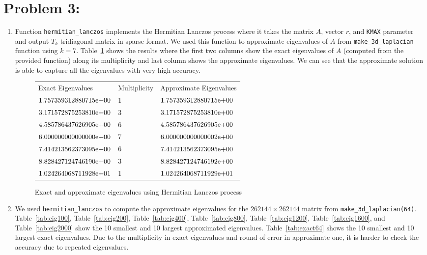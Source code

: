 \newpage
\section*{Problem 3:}
\begin{enumerate}
\item Function \texttt{hermitian\_lanczos} implements the Hermitian Lanczos process where it takes the matrix $A$, vector $r$, and \texttt{KMAX} parameter and output $T_{k}$ tridiagonal matrix in sparse format. We used this function to approximate eigenvalues of $A$ from \texttt{make\_3d\_laplacian} function using $k=7$. Table~\ref{tab:eig7} shows the results where the first two columns show the exact eigenvalues of $A$ (computed from the provided function) along its multiplicity and last column shows the approximate eigenvalues. We can see that the approximate solution is able to capture all the eigenvalues with very high accuracy.

\begin{figure}[tbh]
 \centering    
\begin{tabular}{ |p{5cm}| p{2cm}|| p{5cm}|}
\hline
 Exact Eigenvalues  & Multiplicity & Approximate Eigenvalues \\ \hhline{|=|=|=|}   
${1.757359312880715}\mathrm{e}{+00}$ & 1& ${1.757359312880715}\mathrm{e}{+00}$ \\
${3.171572875253810}\mathrm{e}{+00}$ &3 & ${3.171572875253810}\mathrm{e}{+00}$ \\
${4.585786437626905}\mathrm{e}{+00}$ &6 & ${4.585786437626905}\mathrm{e}{+00}$ \\
${6.000000000000000}\mathrm{e}{+00}$ & 7& ${6.000000000000002}\mathrm{e}{+00}$ \\
${7.414213562373095}\mathrm{e}{+00}$&6 & ${7.414213562373095}\mathrm{e}{+00}$ \\
${8.828427124746190}\mathrm{e}{+00}$ &3 & ${8.828427124746192}\mathrm{e}{+00}$ \\
${1.024264068711928}\mathrm{e}{+01}$ &1 & ${1.024264068711929}\mathrm{e}{+01}$ \\
\hline
\end{tabular} 
\caption{Exact and approximate eigenvalues using Hermitian Lanczos process}
   \label{tab:eig7}
\end{figure}

\item We used \texttt{hermitian\_lanczos} to compute the approximate eigenvalues for the $262144 \times 262144$ matrix from \texttt{make\_3d\_laplacian(64)}. Table~\ref{tab:eig100}, Table~\ref{tab:eig200}, Table~\ref{tab:eig400}, Table~\ref{tab:eig800}, Table~\ref{tab:eig1200}, Table~\ref{tab:eig1600}, and Table~\ref{tab:eig2000} show the 10 smallest and 10 largest approximated eigenvalues. Table~\ref{tab:exact64} shows the 10 smallest and 10 largest exact eigenvalues. Due to the multiplicity in exact eigenvalues and round of error in approximate one, it is harder to check the accuracy due to repeated eigenvalues. 


\end{enumerate}
